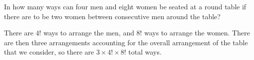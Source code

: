 \documentclass[10pt]{article}
\begin{document}
	\begin{problem}
		In how many ways can four men and eight women be seated at a round table if there are to be two women
		between consecutive men around the table? 
	\end{problem}

	\begin{solution}
		There are \( 4! \) ways to arrange the men, and \( 8! \) ways to arrange the women. There are then
		three arrangements accounting for the overall arrangement of the table that we consider, so there are 
		\( 3 \times 4! \times 8! \) total ways. 
	\end{solution}

	
\end{document}

